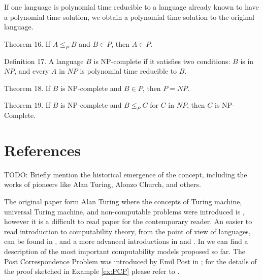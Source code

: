 If one language is polynomial time reducible to a language already known to have a polynomial time solution, we obtain a polynomial time solution to the original language.

Theorem 16. If $A\leq_{P}B$ and $B\in P$, then $A\in P$.

Definition 17. A language $B$ is NP-complete if it satisfies two conditions: $B$ is in $NP$, and every $A$ in $NP$ is polynomial time reducible to $B$.

Theorem 18. If $B$ is NP-complete and $B\in P$, then $P=NP$.

Theorem 19. If $B$ is NP-complete and $B\leq_{P}C$ for $C$ in $NP$, then $C$ is NP-Complete.


%
%

\section*{References}

{\color{red} TODO:  Briefly mention the historical emergence of the concept, including the works of pioneers like Alan Turing, Alonzo Church, and others.}

The original paper form Alan Turing where the concepts of Turing machine, universal Turing machine, and non-computable problems were introduced is \cite{turing1936computable}, however it is a difficult to read paper for the contemporary reader. An easier to read introduction to computability theory, from the point of view of languages, can be found in \cite{sipser2012introduction}, and a more advanced introductions in \cite{cooper2003computability} and \cite{soare2016turing}. In \cite{fernandez2009models} we can find a description of the most important computability models proposed so far. The Post Correspondence Problem was introduced by Emil Post in \cite{post1946variant}; for the details of the proof sketched in Example \ref{ex:PCP} please refer to \cite{sipser2012introduction}.

